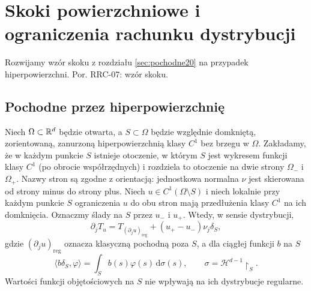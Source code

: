 
\section{Skoki powierzchniowe i ograniczenia rachunku dystrybucji}
\label{sec:dt-jumps-products}
\providecommand{\atlasref}[2]{#2}
Rozwijamy wzór skoku z rozdziału \ref{sec:pochodne20}
na przypadek hiperpowierzchni. Por.
\atlasref{PDE-07::thm:pde7-jump}{RRC-07: wzór skoku}.
\subsection{Pochodne przez hiperpowierzchnię}
\begin{twierdzenie}
\label{thm:dt-hypersurface-jump}
Niech $\Omega\subset\mathbb R^d$ będzie otwarta, a
$S\subset\Omega$ będzie względnie domkniętą,
zorientowaną, zanurzoną hiperpowierzchnią klasy $C^1$
bez brzegu w $\Omega$. Zakładamy, że w każdym
punkcie $S$ istnieje otoczenie, w którym $S$ jest
wykresem funkcji klasy $C^1$ (po obrocie współrzędnych)
i rozdziela to otoczenie na dwie strony $\Omega_-$
i $\Omega_+$. Nazwy stron są zgodne z orientacją:
jednostkowa normalna $\nu$ jest skierowana
od strony minus do strony plus.
Niech $u\in C^1(\Omega\setminus S)$ i niech lokalnie
przy każdym punkcie $S$ ograniczenia $u$ do obu stron
mają przedłużenia klasy $C^1$ na ich domknięcia.
Oznaczmy ślady na $S$ przez $u_-$ i $u_+$.
Wtedy, w sensie dystrybucji,
\begin{equation}\label{eq:dt-hypersurface-jump}
 \partial_jT_u=T_{(\partial_ju)_{\mathrm{reg}}}
 +(u_+-u_-)\nu_j\delta_S,
\end{equation}
gdzie $(\partial_ju)_{\mathrm{reg}}$ oznacza klasyczną
pochodną poza $S$, a dla ciągłej funkcji $b$ na $S$
\[
 \langle b\delta_S,\varphi\rangle
 =\int_S b(s)\varphi(s)\,\mathrm d\sigma(s),
 \qquad \sigma=\mathcal H^{d-1}\!\restriction_S.
\]
Wartości funkcji objętościowych na $S$ nie wpływają
na ich dystrybucje regularne.
\end{twierdzenie}
